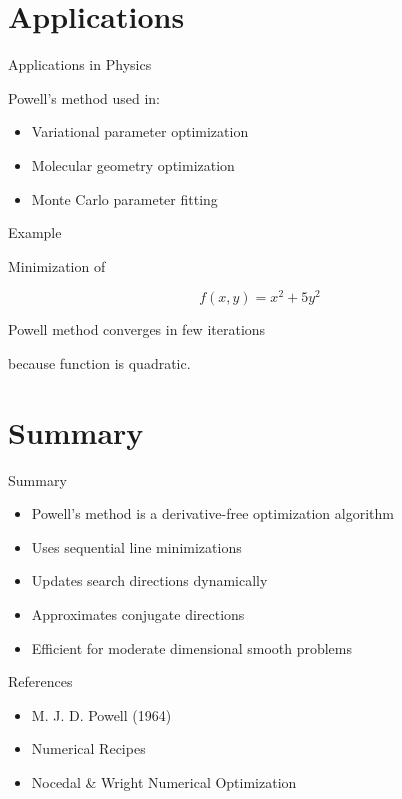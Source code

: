 \documentclass{beamer}
\begin{document}
\section{Applications}

\begin{frame}{Applications in Physics}

Powell's method used in:

\begin{itemize}
\item Variational parameter optimization
\item Molecular geometry optimization
\item Monte Carlo parameter fitting
\end{itemize}
\end{frame}

\begin{frame}{Example}

Minimization of

\[
f(x,y) = x^2 + 5y^2
\]

Powell method converges in few iterations

because function is quadratic.
\end{frame}

\section{Summary}

\begin{frame}{Summary}

\begin{itemize}
\item Powell's method is a derivative-free optimization algorithm
\item Uses sequential line minimizations
\item Updates search directions dynamically
\item Approximates conjugate directions
\item Efficient for moderate dimensional smooth problems
\end{itemize}
\end{frame}

\begin{frame}{References}

\begin{itemize}

\item M. J. D. Powell (1964)

\item Numerical Recipes

\item Nocedal \& Wright
Numerical Optimization

\end{itemize}

\end{frame}
\end{document}
